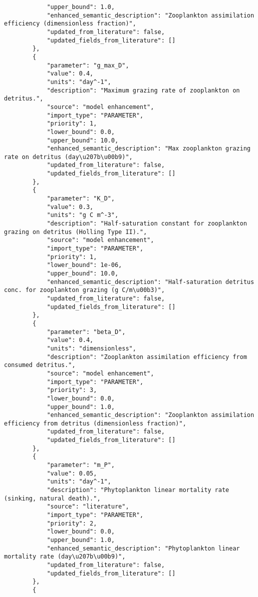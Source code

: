 \begin{lstlisting}
            "upper_bound": 1.0,
            "enhanced_semantic_description": "Zooplankton assimilation efficiency (dimensionless fraction)",
            "updated_from_literature": false,
            "updated_fields_from_literature": []
        },
        {
            "parameter": "g_max_D",
            "value": 0.4,
            "units": "day^-1",
            "description": "Maximum grazing rate of zooplankton on detritus.",
            "source": "model enhancement",
            "import_type": "PARAMETER",
            "priority": 1,
            "lower_bound": 0.0,
            "upper_bound": 10.0,
            "enhanced_semantic_description": "Max zooplankton grazing rate on detritus (day\u207b\u00b9)",
            "updated_from_literature": false,
            "updated_fields_from_literature": []
        },
        {
            "parameter": "K_D",
            "value": 0.3,
            "units": "g C m^-3",
            "description": "Half-saturation constant for zooplankton grazing on detritus (Holling Type II).",
            "source": "model enhancement",
            "import_type": "PARAMETER",
            "priority": 1,
            "lower_bound": 1e-06,
            "upper_bound": 10.0,
            "enhanced_semantic_description": "Half-saturation detritus conc. for zooplankton grazing (g C/m\u00b3)",
            "updated_from_literature": false,
            "updated_fields_from_literature": []
        },
        {
            "parameter": "beta_D",
            "value": 0.4,
            "units": "dimensionless",
            "description": "Zooplankton assimilation efficiency from consumed detritus.",
            "source": "model enhancement",
            "import_type": "PARAMETER",
            "priority": 3,
            "lower_bound": 0.0,
            "upper_bound": 1.0,
            "enhanced_semantic_description": "Zooplankton assimilation efficiency from detritus (dimensionless fraction)",
            "updated_from_literature": false,
            "updated_fields_from_literature": []
        },
        {
            "parameter": "m_P",
            "value": 0.05,
            "units": "day^-1",
            "description": "Phytoplankton linear mortality rate (sinking, natural death).",
            "source": "literature",
            "import_type": "PARAMETER",
            "priority": 2,
            "lower_bound": 0.0,
            "upper_bound": 1.0,
            "enhanced_semantic_description": "Phytoplankton linear mortality rate (day\u207b\u00b9)",
            "updated_from_literature": false,
            "updated_fields_from_literature": []
        },
        {

\end{lstlisting}
